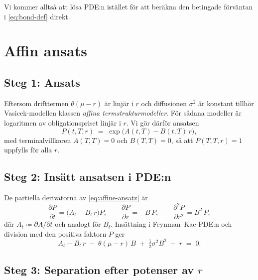 \documentclass[11pt,a4paper]{article}
\theoremstyle{plain}
\theoremstyle{definition}
\theoremstyle{remark}
\begin{document}
Vi kommer alltså att lösa PDE:n istället för att beräkna den betingade förväntan i \eqref{eq:bond-def} direkt.

\section{Affin ansats}

\subsection*{Steg 1: Ansats}

Eftersom drifttermen $\theta(\mu-r)$ är linjär i $r$ och diffusionen $\sigma^2$ är konstant tillhör Vasicek-modellen klassen \emph{affina termstrukturmodeller}. För sådana modeller är logaritmen av obligationspriset linjär i $r$. Vi gör därför ansatsen
\begin{equation}
    P(t,T,r) \;=\; \exp\!\bigl(A(t,T) - B(t,T)\,r\bigr),
    \label{eq:affine-ansatz}
\end{equation}
med terminalvillkoren $A(T,T) = 0$ och $B(T,T) = 0$, så att $P(T,T,r) = 1$ uppfylls för alla $r$.

\subsection*{Steg 2: Insätt ansatsen i PDE:n}

De partiella derivatorna av \eqref{eq:affine-ansatz} är
\[
    \frac{\partial P}{\partial t} = \bigl(A_t - B_t\,r\bigr)P, \qquad
    \frac{\partial P}{\partial r} = -B\,P, \qquad
    \frac{\partial^2 P}{\partial r^2} = B^2\,P,
\]
där $A_t \coloneqq \partial A/\partial t$ och analogt för $B_t$. Insättning i Feynman--Kac-PDE:n och division med den positiva faktorn $P$ ger
\begin{equation}
    A_t - B_t\,r \;-\; \theta(\mu-r)\,B \;+\; \tfrac12\sigma^2 B^2 \;-\; r \;=\; 0.
    \label{eq:after-substitution}
\end{equation}

\subsection*{Steg 3: Separation efter potenser av $r$}
\end{document}
